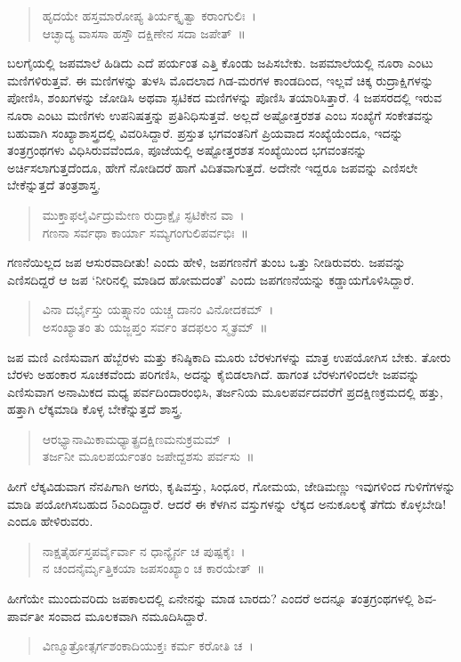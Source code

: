 {\begin{verse}
ಹೃದಯೇ ಹಸ್ತಮಾರೋಪ್ಯ ತಿರ್ಯಕ್ಕೃತ್ವಾ ಕರಾಂಗುಲಿಃ~। \\
ಆಚ್ಛಾದ್ಯ ವಾಸಸಾ ಹಸ್ತೌ ದಕ್ಷಿಣೇನ ಸದಾ ಜಪೇತ್~॥
\end{verse}
ಬಲಗೈಯಲ್ಲಿ ಜಪಮಾಲೆ ಹಿಡಿದು ಎದೆ ಪರ್ಯಂತ ಎತ್ತಿ ಕೊಂಡು ಜಪಿಸಬೇಕು. ಜಪಮಾಲೆಯಲ್ಲಿ ನೂರಾ ಎಂಟು ಮಣಿಗಳಿರುತ್ತವೆ. ಈ ಮಣಿಗಳನ್ನು ತುಳಸಿ ಮೊದಲಾದ ಗಿಡ-ಮರಗಳ ಕಾಂಡದಿಂದ, ಇಲ್ಲವೆ ಚಿಕ್ಕ ರುದ್ರಾಕ್ಷಿಗಳನ್ನು ಪೋಣಿಸಿ, ಶಂಖ\-ಗಳನ್ನು ಜೋಡಿಸಿ ಅಥವಾ ಸ್ಫಟಿಕದ ಮಣಿಗಳನ್ನು ಪೊಣಿಸಿ ತಯಾರಿಸಿತ್ತಾರೆ. 4 ಜಪ\-ಸರದಲ್ಲಿ ಇರುವ ನೂರಾ ಎಂಟು ಮಣಿಗಳು ಉಪನಿಷತ್ತನ್ನು ಪ್ರತಿನಿಧಿಸುತ್ತವೆ. ಅಲ್ಲದೆ ಅಷ್ಟೋತ್ತರ\-ಶತ ಎಂಬ ಸಂಖ್ಯೆಗೆ ಸಂಕೇತವನ್ನು ಬಹುವಾಗಿ ಸಂಖ್ಯಾಶಾಸ್ತ್ರದಲ್ಲಿ ವಿವರಿಸಿ\-ದ್ದಾರೆ. ಪ್ರಸ್ತುತ ಭಗವಂತನಿಗೆ ಪ್ರಿಯವಾದ ಸಂಖ್ಯೆಯೆಂದೂ, ಇದನ್ನು ತಂತ್ರ\-ಗ್ರಂಥಗಳು ವಿಧಿಸಿರುವವೆಂದೂ, ಪೂಜೆಯಲ್ಲಿ ಅಷ್ಟೋತ್ತರಶತ ಸಂಖ್ಯೆಯಿಂದ ಭಗವಂತ\-ನನ್ನು ಅರ್ಚಿಸಲಾಗುತ್ತದೆಂದೂ, ಹೇಗೆ ನೋಡಿದರೆ ಹಾಗೆ ವಿದಿತವಾಗುತ್ತದೆ. ಅದೇನೇ ಇದ್ದರೂ ಜಪವನ್ನು ಎಣಿಸಲೇ ಬೇಕೆನ್ನುತ್ತದೆ ತಂತ್ರಶಾಸ್ತ್ರ.
\begin{verse}
ಮುಕ್ತಾಫಲೈರ್ವಿದ್ರುಮೇಣ ರುದ್ರಾಕ್ಷೈಃ ಸ್ಫಟಿಕೇನ ವಾ~। \\
ಗಣನಾ ಸರ್ವಥಾ ಕಾರ್ಯಾ ಸಮ್ಯಗಂಗುಲಿಪರ್ವಭಿಃ~॥
\end{verse}
ಗಣನೆಯಿಲ್ಲದ ಜಪ ಆಸುರವಾದೀತು! ಎಂದು ಹೇಳಿ, ಜಪಗಣನೆಗೆ ತುಂಬ ಒತ್ತು ನೀಡಿರುವರು. ಜಪವನ್ನು ಎಣಿಸದಿದ್ದರೆ ಆ ಜಪ ‘ನೀರಿನಲ್ಲಿ ಮಾಡಿದ ಹೋಮದಂತೆ’ ಎಂದು ಜಪಗಣನೆಯನ್ನು ಕಡ್ಡಾಯಗೊಳಿಸಿದ್ದಾರೆ.
\begin{verse}
ವಿನಾ ದರ್ಭೈಸ್ತು ಯತ್ಸ್ನಾನಂ ಯಚ್ಚ ದಾನಂ ವಿನೋದಕಮ್~। \\
ಅಸಂಖ್ಯಾತಂ ತು ಯಜ್ಜಪ್ತಂ ಸರ್ವಂ ತದಫಲಂ ಸ್ಮೃತಮ್~॥
\end{verse}
ಜಪ ಮಣಿ ಎಣಿಸುವಾಗ ಹೆಬ್ಬೆರಳು ಮತ್ತು ಕನಿಷ್ಠಿಕಾದಿ ಮೂರು ಬೆರಳುಗಳನ್ನು ಮಾತ್ರ ಉಪಯೋಗಿಸ ಬೇಕು. ತೋರು ಬೆರಳು ಅಹಂಕಾರ ಸೂಚಕವೆಂದು ಪರಿಗಣಿಸಿ, ಅದನ್ನು ಕೈಬಿಡಲಾಗಿದೆ. ಹಾಗಂತ ಬೆರಳುಗಳಿಂದಲೇ ಜಪವನ್ನು ಎಣಿಸುವಾಗ ಅನಾಮಿಕದ ಮಧ್ಯ ಪರ್ವದಿಂದಾರಂಭಿಸಿ, ತರ್ಜನಿಯ ಮೂಲಪರ್ವದವರೆಗೆ ಪ್ರದಕ್ಷಿಣಕ್ರಮದಲ್ಲಿ ಹತ್ತು, ಹತ್ತಾಗಿ ಲೆಕ್ಕಮಾಡಿ ಕೊಳ್ಳ ಬೇಕೆನ್ನುತ್ತದೆ ಶಾಸ್ತ್ರ.
\begin{verse}
ಆರಭ್ಯಾನಾಮಿಕಾಮಧ್ಯಾತ್ಪ್ರದಕ್ಷಿಣಮನುಕ್ರಮಮ್~। \\
ತರ್ಜನೀ ಮೂಲಪರ್ಯಂತಂ ಜಪೇದ್ದಶಸು ಪರ್ವಸು~॥
\end{verse}
ಹೀಗೆ ಲೆಕ್ಕವಿಡುವಾಗ ನೆನಪಿಗಾಗಿ ಅಗರು, ಕೃಷಿವಸ್ತು, ಸಿಂಧೂರ, ಗೋಮಯ, ಜೇಡಿಮಣ್ಣು ಇವುಗಳಿಂದ ಗುಳಿಗೆಗಳನ್ನು ಮಾಡಿ ಪಯೋಗಿಸಬಹುದ 5ಎಂದಿದ್ದಾರೆ. ಆದರೆ ಈ ಕೆಳಗಿನ ವಸ್ತುಗಳನ್ನು ಲೆಕ್ಕದ ಅನುಕೂಲಕ್ಕೆ ತೆಗೆದು ಕೊಳ್ಳಬೇಡಿ! ಎಂದೂ ಹೇಳಿ\-ರುವರು.
\begin{verse}
ನಾಕ್ಷತೈರ್ಹಸ್ತಪರ್ವೈರ್ವಾ ನ ಧಾನ್ಯೈರ್ನ ಚ ಪುಷ್ಪಕೈಃ~। \\
ನ ಚಂದನೈರ್ಮೃತ್ತಿಕಯಾ ಜಪಸಂಖ್ಯಾಂ ಚ ಕಾರಯೇತ್~॥
\end{verse}
ಹೀಗೆಯೇ ಮುಂದುವರಿದು ಜಪಕಾಲದಲ್ಲಿ ಏನೇನನ್ನು ಮಾಡ ಬಾರದು? ಎಂದರೆ ಅದನ್ನೂ ತಂತ್ರಗ್ರಂಥಗಳಲ್ಲಿ ಶಿವ-ಪಾರ್ವತೀ ಸಂವಾದ ಮೂಲಕವಾಗಿ ನಮೂದಿಸಿದ್ದಾರೆ.
\begin{verse}
ವಿಣ್ಮೂತ್ರೋತ್ಸರ್ಗಶಂಕಾದಿಯುಕ್ತಃ ಕರ್ಮ ಕರೋತಿ ಚ~। \\

\end{verse}}

